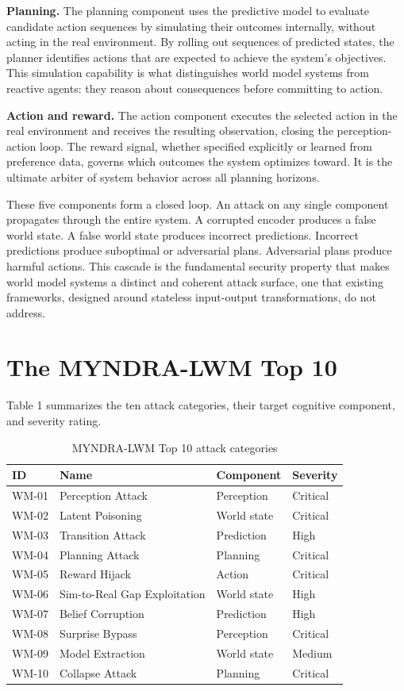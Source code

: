\documentclass[11pt,a4paper]{article}
\begin{document}
\textbf{Planning.} The planning component uses the predictive model to evaluate candidate action sequences by simulating their outcomes internally, without acting in the real environment. By rolling out sequences of predicted states, the planner identifies actions that are expected to achieve the system's objectives. This simulation capability is what distinguishes world model systems from reactive agents: they reason about consequences before committing to action.

\textbf{Action and reward.} The action component executes the selected action in the real environment and receives the resulting observation, closing the perception-action loop. The reward signal, whether specified explicitly or learned from preference data, governs which outcomes the system optimizes toward. It is the ultimate arbiter of system behavior across all planning horizons.

These five components form a closed loop. An attack on any single component propagates through the entire system. A corrupted encoder produces a false world state. A false world state produces incorrect predictions. Incorrect predictions produce suboptimal or adversarial plans. Adversarial plans produce harmful actions. This cascade is the fundamental security property that makes world model systems a distinct and coherent attack surface, one that existing frameworks, designed around stateless input-output transformations, do not address.

\section{The MYNDRA-LWM Top 10}

Table 1 summarizes the ten attack categories, their target cognitive component, and severity rating.

\begin{table}[h]
\centering
\small
\begin{tabular}{llll}
\toprule
\textbf{ID} & \textbf{Name} & \textbf{Component} & \textbf{Severity} \\
\midrule
WM-01 & Perception Attack & Perception & Critical \\
WM-02 & Latent Poisoning & World state & Critical \\
WM-03 & Transition Attack & Prediction & High \\
WM-04 & Planning Attack & Planning & Critical \\
WM-05 & Reward Hijack & Action & Critical \\
WM-06 & Sim-to-Real Gap Exploitation & World state & High \\
WM-07 & Belief Corruption & Prediction & High \\
WM-08 & Surprise Bypass & Perception & Critical \\
WM-09 & Model Extraction & World state & Medium \\
WM-10 & Collapse Attack & Planning & Critical \\
\bottomrule
\end{tabular}
\caption{MYNDRA-LWM Top 10 attack categories}
\end{table}
\end{document}
